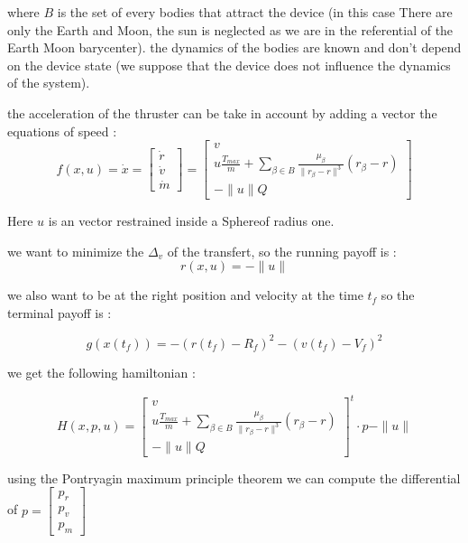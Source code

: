 \documentclass[11pt]{article} %
\begin{document}
			where $B$ is the set of every bodies that attract the device (in this case There are only the Earth and Moon, the sun is neglected as we are in the referential of the Earth Moon barycenter). the dynamics of the bodies are known and don't depend on the device state (we suppose that the device does not influence the dynamics of the system).
			
			the acceleration of the thruster can be take in account by adding a vector the equations of speed : \\
			
			$$
			f(x,u)=\dot{x}=
			\begin{bmatrix}
				\dot{r}\\
				\dot{v}\\
				\dot{m}
			\end{bmatrix}
			=\begin{bmatrix}
				v\\
				u\frac{T_ {max}}{m}+\sum\limits _{\beta \in B }\frac{\mu _{\beta }}{\| r_{\beta } -r\| ^{3}}( r_{\beta } -r)\\
				-\|u\|Q
			\end{bmatrix}
			$$
			
			Here $u$ is an vector restrained inside a Sphereof radius one. 
			
			we want to minimize the $\Delta_v$ of the transfert, so the running payoff is :
			$$
			r(x,u)=-\|u\|
			$$ 
			
			we also want to be at the right position and velocity at the time $t_f$ so the terminal payoff is :
			
			$$
			g(x(t_f))=-(r(t_f)-R_f)^2-(v(t_f)-V_f)^2
			$$
			
			we get the following hamiltonian :
			
			$$
			H(x,p,u)=\begin{bmatrix}
				v\\
				u\frac{T_ {max}}{m}+\sum\limits _{\beta \in B }\frac{\mu _{\beta }}{\| r_{\beta } -r\| ^{3}}( r_{\beta } -r)\\
				-\|u\|Q
			\end{bmatrix}^t\cdot p-\|u\|
			$$
			
			using the Pontryagin maximum principle theorem we can compute the differential of $p=\begin{bmatrix}p_r\\p_v\\p_m\end{bmatrix}$
			
\end{document}
